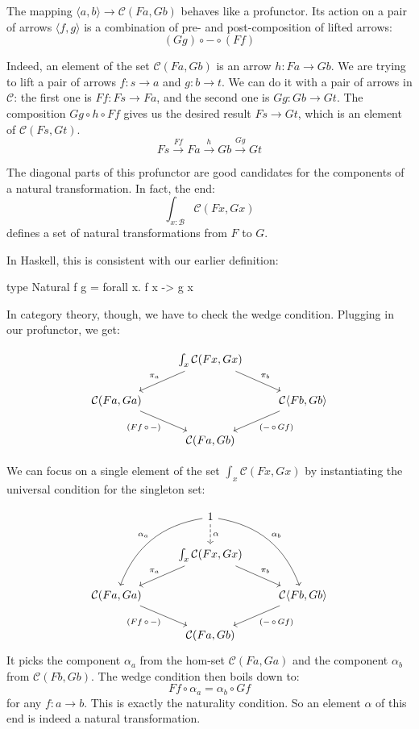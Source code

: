 \documentclass[DaoFP]{subfiles}
\begin{document}
The mapping  $\langle a, b \rangle \to \mathcal{C} (F a, G b)$ behaves like a profunctor. Its action on a pair of arrows $\langle f, g \rangle$ is a combination of pre- and post-composition of lifted arrows:
 \[ (G g) \circ - \circ (F f) \]

Indeed, an element of the set $ \mathcal{C} (F a, G b)$ is an arrow $h \colon F a \to G b$. We are trying to lift a pair of arrows $f \colon s \to a$ and $g \colon b \to t$. We can do it with a pair of arrows in $\mathcal{C}$: the first one is $F f \colon F s \to F a$, and the second one is $G g \colon G b \to G t$. The composition $G g \circ h \circ F f$ gives us the desired result $ F s \to G t$, which is an element of $\mathcal{C} (F s, G t)$.
\[ F s \xrightarrow{F f} F a \xrightarrow{h} G b \xrightarrow{G g} G t \]

The diagonal parts of this profunctor are good candidates for the components of a natural transformation. In fact, the end:
\[  \int_{x \colon  \mathcal{B}} \mathcal{C}(F x, G x) \]
defines a set of natural transformations from $F$ to $G$.

In Haskell, this is consistent with our earlier definition:
\begin{haskell}
type Natural f g = forall x. f x -> g x
\end{haskell}

In category theory, though, we have to check the wedge condition. Plugging in our profunctor, we get:

\[
 \begin{tikzcd}
 & \int_{x} \mathcal{C}(F x, G x)
 \arrow[ld, "\pi_a"']
 \arrow[rd, "\pi_b"]
 \\
  \mathcal{C} ( F a, G a )
 \arrow[dr, "{(Ff \, \circ \, -)}"']
 && \mathcal{C} \langle F b, G b \rangle
 \arrow[dl, "{(- \, \circ\, Gf)}"]
 \\
 &  \mathcal{C} ( F a, G b )
 \end{tikzcd}
\]

We can focus on a single element of the set $\int_{x} \mathcal{C}(F x, G x)$ by instantiating the universal condition for the singleton set:

\[
 \begin{tikzcd}
 & 1
 \arrow[d, dashed, "\alpha"]
\arrow[ddl, bend right, "\alpha_a"']
 \arrow[ddr, bend left, "\alpha_b"]
 \\
 & \int_{x} \mathcal{C}(F x, G x)
 \arrow[ld, "\pi_a"']
 \arrow[rd, "\pi_b"]
 \\
  \mathcal{C} ( F a, G a )
 \arrow[dr, "{(F f \, \circ \, -)}"']
 && \mathcal{C} \langle F b, G b \rangle
 \arrow[dl, "{(- \, \circ\, G f)}"]
 \\
 &  \mathcal{C} ( F a, G b )
 \end{tikzcd}
\]
It picks the component $\alpha_a$ from the hom-set $\mathcal{C} ( F a, G a )$ and the component $\alpha_b$ from $\mathcal{C} ( F b, G b )$. The wedge condition then boils down to:
\[ F f \circ \alpha_a = \alpha_b \circ G f \]
for any $f \colon a \to b$. This is exactly the naturality condition. So an element $\alpha$ of this end is indeed a natural transformation.
\end{document}
